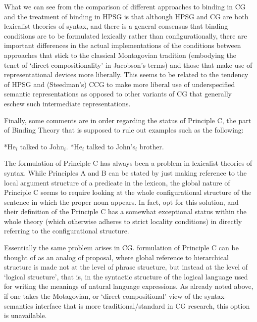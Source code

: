 \documentclass[output=paper]{langsci/langscibook}
\begin{document}
What we can see from the comparison of different approaches to binding
in CG and the treatment of binding in HPSG is that although HPSG and
CG are both lexicalist theories of syntax, and there is a general
consensus that binding conditions are to be formulated lexically
rather than configurationally, there are important differences in the
actual implementations of the conditions between approaches that stick to
the classical Montagovian tradition (embodying the tenet of `direct
compositionality' in Jacobson's terms) and those that make use of
representational devices more liberally. This seems to be related to
the tendency of HPSG and (Steedman's) CCG to make more liberal use of
underspecified semantic representations as opposed to other variants
of CG that generally eschew such intermediate representations.


Finally, some comments are in order regarding the status of
Principle C, the part of Binding Theory that is
supposed to rule out examples such as the following:

\begin{exe}
 \ex\label{}
  \begin{xlist}
 \ex\label{}
    *He\ensuremath{_i} talked to John\ensuremath{_i}.
 \ex\label{}
    *He\ensuremath{_i} talked to John's\ensuremath{_i} brother.
  \end{xlist}
\end{exe}

The formulation of Principle C has always been a problem in lexicalist
theories of syntax. While Principles A and
B can be stated by just making reference to the local argument
structure of a predicate in the lexicon, the global nature of
Principle C seems to require looking at the
whole configurational structure of the sentence
in which  the proper noun appears. In fact, \citet{ps2} opt for this
solution, and their definition of the Principle C
has a somewhat exceptional status within the whole theory
(which otherwise adheres to strict locality conditions)
in directly referring to the configurational structure. 

Essentially the same problem arises in CG.  formulation
of Principle C can be thought of as an analog of  proposal,
where global reference to hierarchical structure is made not at the
level of phrase structure, but instead at the level of `logical
structure', that is, in the syntactic structure of the logical
language used for writing the meanings of natural language
expressions. As already noted above, if one takes the Motagovian, or
`direct compositional' view of the syntax-semantics interface that is
more traditional/standard in CG research, this option is unavailable.
\end{document}
